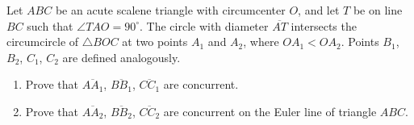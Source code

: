Let $ABC$ be an acute scalene triangle with circumcenter $O$, and let $T$ be on line $BC$ such that $\angle TAO = 90^{\circ}$. The circle with diameter $\overline{AT}$ intersects the circumcircle of $\triangle BOC$ at two points $A_1$ and $A_2$, where $OA_1 < OA_2$. Points $B_1$, $B_2$, $C_1$, $C_2$ are defined analogously.
\begin{enumerate}[label=(\alph*)]
	\item Prove that $\overline{AA_1}$, $\overline{BB_1}$, $\overline{CC_1}$ are concurrent. 
	\item Prove that $\overline{AA_2}$, $\overline{BB_2}$, $\overline{CC_2}$ are concurrent on the Euler line of triangle $ABC$.
\end{enumerate}